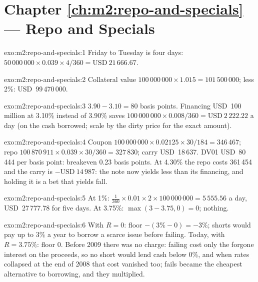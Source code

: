 \section*{Chapter \ref{ch:m2:repo-and-specials} --- Repo and Specials}

\begin{solution}{exo:m2:repo-and-specials:1}
Friday to Tuesday is four days: $50\,000\,000 \times 0.039 \times 4/360 =
\text{USD}~21\,666.67$.
\end{solution}

\begin{solution}{exo:m2:repo-and-specials:2}
Collateral value $100\,000\,000 \times 1.015 = 101\,500\,000$; less 2\%:
USD~99\,470\,000.
\end{solution}

\begin{solution}{exo:m2:repo-and-specials:3}
 $3.90 - 3.10 = 80$ basis points. Financing USD~100 million at
3.10\% instead of 3.90\% saves $100\,000\,000 \times 0.008/360 =
\text{USD}~2\,222.22$ a day (on the cash borrowed; scale by the dirty price for
the exact amount).
\end{solution}

\begin{solution}{exo:m2:repo-and-specials:4}
Coupon $100\,000\,000 \times 0.02125 \times 30/184 = 346\,467$; repo $100\,870\,911
\times 0.039 \times 30/360 = 327\,830$; carry USD~18\,637. DV01 USD~80\,444 per
basis point: breakeven 0.23 basis points. At 4.30\% the repo costs 361\,454 and
the carry is $-\text{USD}~14\,987$: the note now yields less than its financing,
and holding it is a bet that yields fall.
\end{solution}

\begin{solution}{exo:m2:repo-and-specials:5}
At 1\%: $\frac{1}{360} \times 0.01 \times 2 \times 100\,000\,000 = 5\,555.56$ a
day, USD~27\,777.78 for five days. At 3.75\%: $\max(3 - 3.75, 0) = 0$; nothing.
\end{solution}

\begin{solution}{exo:m2:repo-and-specials:6}
With $R = 0$: floor $-(3\% - 0) = -3\%$; shorts would pay up to 3\% a year to
borrow a scarce issue before failing. Today, with $R = 3.75\%$: floor 0.
Before 2009 there was no charge: failing cost only the forgone interest on
the proceeds, so no short would lend cash below 0\%, and when rates collapsed
at the end of 2008 that cost vanished too; fails became the cheapest
alternative to borrowing, and they multiplied.
\end{solution}

